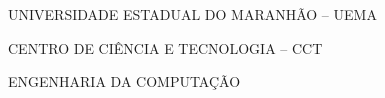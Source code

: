 \renewcommand{\imprimircapa}{%
	\begin{capa}%
		\center

		{\fontseries{b}\selectfont\MakeTextUppercase{UNIVERSIDADE ESTADUAL DO MARANHÃO -- UEMA}}
		
		{\fontseries{b}\selectfont\MakeTextUppercase{CENTRO DE CIÊNCIA E TECNOLOGIA -- CCT  }}
		
		{\fontseries{b}\selectfont\MakeTextUppercase{ENGENHARIA DA COMPUTAÇÃO  }}
		
		\vfill
		
		{\fontseries{b}\selectfont\MakeTextUppercase{\normalsize\imprimirautor}}
		
		\vfill
		\begin{center}
			{\fontseries{b}\selectfont\MakeTextUppercase{\imprimirtitulo}}
		\end{center}
		\vfill
		
		\vfill
		
		{\fontseries{b}\selectfont\MakeTextUppercase{\imprimirlocal}}
		\par
		{\selectfont \imprimirdata}
		\vspace*{1cm}
	\end{capa}
}

\imprimircapa